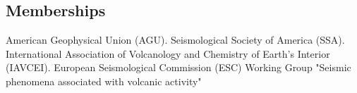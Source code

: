 \documentclass[margin,line]{res}
\begin{document}
\begin{resume}
\begin{comment}
\section{\sc Hazard Management Experience}
{\bf Alaska Volcano Observatory}\\
Participated in the Redoubt Operations Room, February - April 2009 monitoring the eruption and responding to questions by the media and public.\\
Participated in the Shishaldin Operations Room, March - May 1999.\\
Beeper duty, 1998-1999, 2008-present.\\
{\bf Alaska Earthquake Information Center}\\
Developed real-time notification system for emergency managers.\\
Co-developed the Alaska ShakeMap system.\\
Co-developed the Trans-Alaska Pipeline alarm system.\\
Duty Seismologist, 1998-1999, 2006-2008. Responsible for rapid location and dissemination of information of significant earthquakes in Alaska to authorities, media and public.\\
{\bf Montserrat Volcano Observatory 2000-2004}\\
Member of the Risk Assessment Panel & Scientific Advisory Committee, assessing the hazards and risks posed by the Soufriere Hills Volcano.\\
Day-to-day management of the Operations Room which involved deciding access to the day-time entry and exclusion zones, initiating small scale evacuations, and making live radio broadcasts.\\
Represented MVO at weekly VMSG/VEG meetings with the authorities.\\
Acted as MVO Director on several occasions.\\
Alarm duty 24-7. First responder to > 1000 volcano alarms, with call-down responsibility for local authorities.\\
\end{comment}

\section{\sc Memberships}
American Geophysical Union (AGU). Seismological Society of America (SSA). International Association of Volcanology and Chemistry of Earth's Interior (IAVCEI). European Seismological Commission (ESC) Working Group "Seismic phenomena associated with volcanic activity"
\\


\end{resume}
\end{document}
